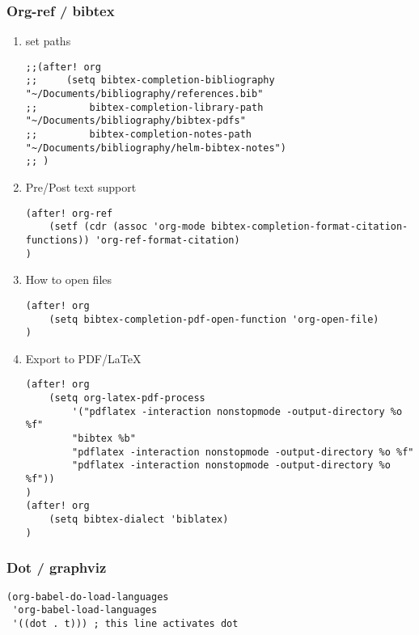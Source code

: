 \documentclass[11pt]{article}
\begin{document}
\subsubsection{Org-ref / bibtex}
\label{sec:orga959dda}
\begin{enumerate}
\item set paths
\label{sec:org063b20b}
\begin{verbatim}
;;(after! org
;;     (setq bibtex-completion-bibliography "~/Documents/bibliography/references.bib"
;;         bibtex-completion-library-path "~/Documents/bibliography/bibtex-pdfs"
;;         bibtex-completion-notes-path "~/Documents/bibliography/helm-bibtex-notes")
;; )
\end{verbatim}
\item Pre/Post text support
\label{sec:org125771c}
\begin{verbatim}
(after! org-ref
    (setf (cdr (assoc 'org-mode bibtex-completion-format-citation-functions)) 'org-ref-format-citation)
)
\end{verbatim}

\item How to open files
\label{sec:orgb63d1f3}
\begin{verbatim}
(after! org
    (setq bibtex-completion-pdf-open-function 'org-open-file)
)
\end{verbatim}
\item Export to PDF/\LaTeX{}
\label{sec:org46a026b}
\begin{verbatim}
(after! org
    (setq org-latex-pdf-process
        '("pdflatex -interaction nonstopmode -output-directory %o %f"
        "bibtex %b"
        "pdflatex -interaction nonstopmode -output-directory %o %f"
        "pdflatex -interaction nonstopmode -output-directory %o %f"))
)
(after! org
    (setq bibtex-dialect 'biblatex)
)
\end{verbatim}
\end{enumerate}

\subsubsection{Dot / graphviz}
\label{sec:orgef4359f}
\begin{verbatim}
(org-babel-do-load-languages
 'org-babel-load-languages
 '((dot . t))) ; this line activates dot
\end{verbatim}
\end{document}
